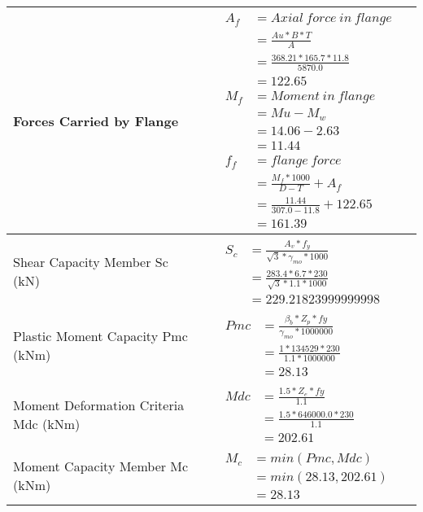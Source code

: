 \documentclass{article}%
\begin{document}
\begin{longtable}{|p{4cm}|p{5cm}|p{5.5cm}|p{1.5cm}|}
\hline%
Forces Carried by Flange&&$\begin{aligned} A_f&= Axial~force~ in ~flange  \\ &= \frac{Au * B *T}{A} \\ &= \frac{368.21 * 165.7*11.8}{5870.0} \\ &=122.65\\ M_f& =Moment~ in~ flange \\  & = Mu-M_w\\ &= 14.06-2.63\\ &=11.44\\  f_f& =flange~force  \\ & = \frac{M_f *1000}{D-T} + A_f \\ &= \frac{11.44}{307.0-11.8} +122.65 \\ &=161.39\end{aligned}$&\\%
\hline%
Shear Capacity Member Sc (kN)&&$\begin{aligned} S_c &= \frac{A_v*f_y}{\sqrt{3}*\gamma_{mo} *1000}\\ &=\frac{283.4*6.7*230}{\sqrt{3}*1.1 *1000}\\ &=229.21823999999998\end{aligned}$&\\%
\hline%
Plastic Moment Capacity Pmc (kNm)&&$\begin{aligned} Pmc &= \frac{\beta_b * Z_p *fy}{\gamma_{mo} * 1000000}\\ &=\frac{1*134529*230}{1.1 * 1000000}\\ &=28.13\end{aligned}$&\\%
\hline%
Moment Deformation Criteria Mdc (kNm)&&$\begin{aligned} Mdc &= \frac{1.5 *Z_e *fy}{1.1}\\ &= \frac{1.5 *646000.0*230}{1.1}\\ &= 202.61\end{aligned}$&\\%
\hline%
Moment Capacity Member Mc (kNm)&&$\begin{aligned} M_c &= min(Pmc,Mdc)\\ &=min(28.13,202.61)\\ &=28.13\end{aligned}$&\\%
\hline%
\end{longtable}

%
\end{document}
